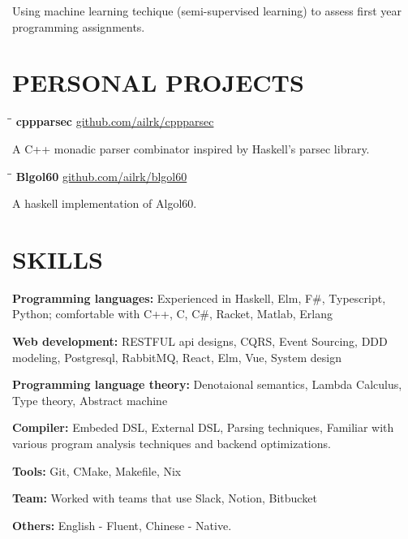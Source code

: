 \documentclass{resume}
\begin{document}
     \vspace{-0.1in}

        Using machine learning techique (semi-supervised learning) to assess first year programming assignments.

     \vspace{-0.1in}

\section{PERSONAL PROJECTS}

    \begin{tabbing}
        \hspace{2.4in}\= \hspace{2in}\= \kill
        {\bf cppparsec } \>               \>\url{github.com/ailrk/cppparsec}\\
    \end{tabbing}

    \vspace{-0.3in}
    A C++ monadic parser combinator inspired by Haskell's parsec library.
    \vspace{-0.15in}

    \begin{tabbing}
        \hspace{2.4in}\= \hspace{2in}\= \kill
        {\bf Blgol60 } \>               \>\url{github.com/ailrk/blgol60}\\

    \end{tabbing}
    \vspace{-0.3in}
    A haskell implementation of Algol60.
    \vspace{-0.1in}


\section{SKILLS}

    \textbf{Programming languages: } Experienced in Haskell, Elm, F\#, Typescript, Python; comfortable with C++, C, C\#, Racket, Matlab, Erlang

    \textbf{Web development: }
        RESTFUL api designs, CQRS, Event Sourcing, DDD modeling, Postgresql, RabbitMQ, React, Elm, Vue, System design

    \textbf{Programming language theory: }
        Denotaional semantics, Lambda Calculus, Type theory, Abstract machine

    \textbf{Compiler: }
        Embeded DSL, External DSL, Parsing techniques, Familiar with various program analysis techniques and backend optimizations.

    \textbf{Tools: } Git, CMake, Makefile, Nix

    \textbf{Team: } Worked with teams that use Slack, Notion, Bitbucket

    \textbf{Others: } English - Fluent, Chinese - Native.
\end{document}
